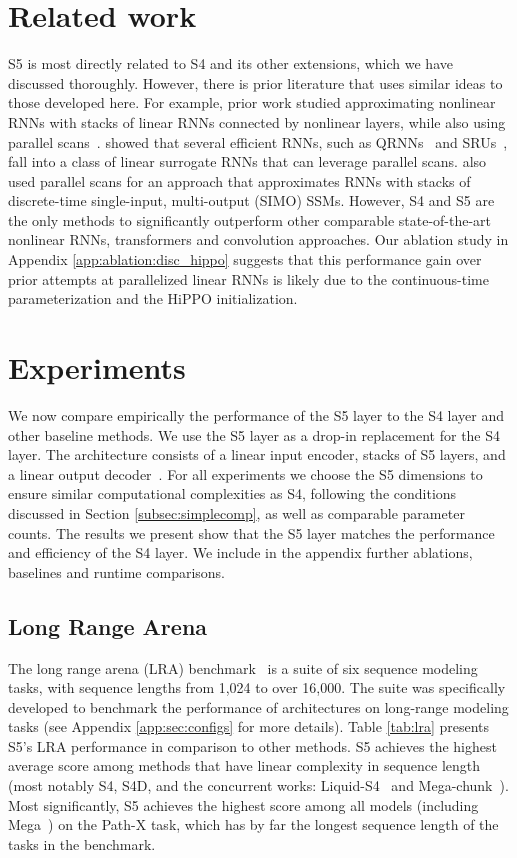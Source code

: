 \section{Related work}
\label{sec: related_worrk} S5 is most directly related to S4 and its other extensions, which we have discussed thoroughly. However, there is prior literature that uses similar ideas to those developed here. For example, prior work studied approximating nonlinear RNNs with stacks of linear RNNs connected by nonlinear layers, while also using parallel scans~\citep{martin2018parallelizing}.  \citet{martin2018parallelizing} showed that several efficient RNNs, such as QRNNs~\citep{bradbury2016quasi} and SRUs~\citep{lei2017simple}, fall into a class of linear surrogate RNNs that can leverage parallel scans. \citet{kaul2020linear} also used parallel scans for an approach that approximates RNNs with stacks of discrete-time single-input, multi-output (SIMO) SSMs.  However, S4 and S5 are the only methods to significantly outperform other comparable state-of-the-art nonlinear RNNs, transformers and convolution approaches.  Our ablation study in Appendix \ref{app:ablation:disc_hippo} suggests that this performance gain over prior attempts at parallelized linear RNNs is likely due to the continuous-time parameterization and the HiPPO initialization.

\section{Experiments}
\label{sec:exp}
We now compare empirically the performance of the S5 layer to the S4 layer and other baseline methods.  We use the S5 layer as a drop-in replacement for the S4 layer.  The architecture consists of a linear input encoder, stacks of S5 layers, and a linear output decoder~\citep{gu2021s4}.  For all experiments we choose the S5 dimensions to ensure similar computational complexities as S4, following the conditions discussed in Section \ref{subsec:simplecomp}, as well as comparable parameter counts.  The results we present show that the S5 layer matches the performance and efficiency of the S4 layer.  We include in the appendix further ablations, baselines and runtime comparisons.

\subsection{Long Range Arena}
\label{subsec:LRA}
The long range arena (LRA) benchmark~\citep{tay2020lra} is a suite of six sequence modeling tasks, with sequence lengths from 1,024 to over 16,000.  The suite was specifically developed to benchmark the performance of architectures on long-range modeling tasks (see Appendix \ref{app:sec:configs} for more details). Table \ref{tab:lra} presents S5's LRA performance in comparison to other methods. S5 achieves the highest average score among methods that have linear complexity in sequence length (most notably S4, S4D, and the concurrent works: Liquid-S4~\citep{hasani2022liquid} and Mega-chunk~\citep{ma2022mega}). Most significantly, S5 achieves the highest score among all models (including Mega~\citep{ma2022mega}) on the Path-X task, which has by far the longest sequence length of the tasks in the benchmark.  

